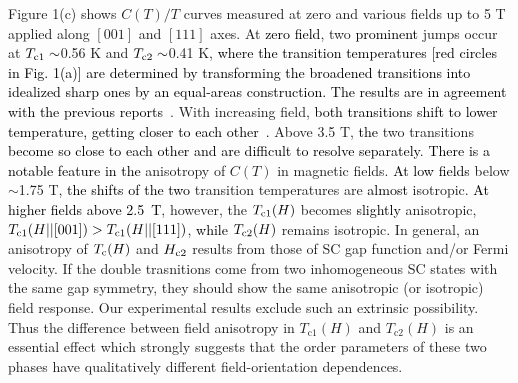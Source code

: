 \documentclass[twocolumn, prl]{revtex4}%
\newcommand{\correct}[1]{\textcolor{black}{#1}}
\begin{document}
Figure 1(c) shows $C(T)/T$ curves measured   at zero and various   fields up to 5 T   applied along   $[001]$ and $[111]$ axes.
At \correct{zero field},  two \correct{prominent}  jumps   
 occur  at $T_{\rm c1} \sim$0.56 K and $T_{\rm c2} \sim$0.41 K, 
 \correct{where the transition temperatures 
 [red circles in Fig. 1(a)]  
 are determined by transforming the broadened transitions into idealized sharp ones by an equal-areas construction.} %
\correct{The results are in agreement with the previous reports}~\cite{Smith_Physica_1985,Ott_PRBR_1985}.
With increasing field, \correct{both transitions shift to lower temperature,  getting closer to each other~\cite{Ott_PRBR_1986,Kromer_PRB_2000}.}
Above 3.5 T, 
\correct{the} two transitions \correct{become so close to each other and are difficult to resolve separately}.
\correct{There is a notable feature in the}   anisotropy of $C(T)$ in magnetic fields. 
\correct{At low fields} below $\sim$1.75 T,  \correct{the shifts of the two}  transition temperatures  are 
 \correct{almost} isotropic.
\correct{At higher fields above 2.5~T},  however,  the $T_{\rm c1}(H)$  becomes \correct{slightly} anisotropic, \correct{$T_{\rm c1}(H||[001])>T_{\rm c1}(H || [111])$},
\correct{while}  $T_{\rm c2}(H)$  remains isotropic.
 In general, an anisotropy of $T_{\rm c}(H)$ and $H_{\rm c2}$  
 results from those of SC gap function and/or   Fermi velocity.
 If the  double trasnitions come from two inhomogeneous SC states with the same gap symmetry,
 they should show the same anisotropic (or isotropic) field response. 
 Our experimental results exclude  such an extrinsic possibility. 
 Thus
  the difference between field anisotropy in 
  $T_{\mathrm{c1} }(H)$ and $T_{\mathrm{c2} }(H)$ is an essential 
 effect which strongly suggests that the order parameters of these two phases have qualitatively different field-orientation dependences.
\color{black}
\end{document}
